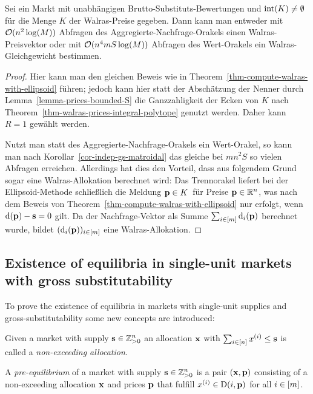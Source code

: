 \begin{theorem}
	Sei ein Markt mit unabhängigen Brutto-Substituts-Bewertungen und $\operatorname{int}(K)\neq \emptyset$ für die Menge $K$ der Walras-Preise gegeben.
	Dann kann man entweder mit $\mathcal{O}(n^2\log(M))$ Abfragen des Aggregierte-Nachfrage-Orakels einen Walras-Preisvektor oder mit $\mathcal{O}(n^4 m S\log(M))$ Abfragen des Wert-Orakels ein Walras-Gleichgewicht bestimmen.
\end{theorem}
\begin{proof}
	Hier kann man den gleichen Beweis wie in Theorem~\ref{thm-compute-walras-with-ellipsoid} führen; jedoch kann hier statt der Abschätzung der Nenner durch Lemma~\ref{lemma-prices-bounded-S} die Ganzzahligkeit der Ecken von $K$ nach Theorem~\ref{thm-walras-prices-integral-polytope} genutzt werden.
	Daher kann $R=1$ gewählt werden.
	
	Nutzt man statt des Aggregierte-Nachfrage-Orakels ein Wert-Orakel, so kann man nach Korollar~\ref{cor-indep-gs-matroidal} das gleiche bei $mn^2S$ so vielen Abfragen erreichen.
	Allerdings hat dies den Vorteil, dass aus folgendem Grund sogar eine Walras-Allokation berechnet wird:
	Das Trennorakel liefert bei der Ellipsoid-Methode schließlich die Meldung \glqq$\mathbf{p}\in K$\grqq\ für Preise $\mathbf{p}\in\mathbb{R}^n$, was nach dem Beweis von Theorem~\ref{thm-compute-walras-with-ellipsoid} nur erfolgt, wenn $\operatorname{d}(\mathbf{p}) - \mathbf{s} = 0$ gilt.
	Da der Nachfrage-Vektor als Summe $\sum_{i\in\left[ m \right]} \operatorname{d}_i(\mathbf{p})$ berechnet wurde, bildet $(\operatorname{d}_i(\mathbf{p}))_{i\in\left[ m \right]}$ eine Walras-Allokation.
\end{proof}

\subsection{Existence of equilibria in single-unit markets with gross substitutability}

To prove the existence of equilibria in markets with single-unit supplies and gross-substitut\-ability some new concepts are introduced:

\begin{definition}
	Given a market with supply $\mathbf{s}\in\mathbb{Z}_{>0}^n$ an allocation $\mathbf{x}$ with $\sum_{i\in\left[ n \right]} x^{(i)} \leq \mathbf{s}$ is called a \emph{non-exceeding allocation}.
	
	A \emph{pre-equilibrium} of a market with supply $\mathbf{s}\in\mathbb{Z}_{>0}^n$ is a  pair $(\mathbf{x}, \mathbf{p})$ consisting of a non-exceeding allocation $\mathbf{x}$ and prices $\mathbf{p}$ that fulfill $x^{(i)}\in\operatorname{D}(i, \mathbf{p})$ for all $i\in\left[ m \right]$.
\end{definition}

